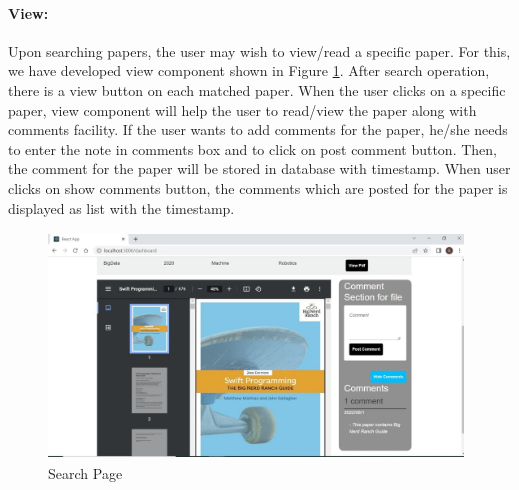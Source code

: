 \paragraph{\textbf{View:}} Upon searching papers, the user may wish to view/read a specific paper. For this, we have developed view component shown in Figure \ref{fig:view}. After search operation, there is a view button on each matched paper. When the user clicks on a specific paper, view component will help the user to read/view the paper along with comments facility. If the user wants to add comments for the paper, he/she needs to enter the note in comments box and to click on post comment button. Then, the comment for the paper will be stored in database with timestamp. When user clicks on show comments button, the comments which are posted for the paper is displayed as list with the timestamp.
\begin{figure}[h]
	\centering
	\includegraphics[width=11cm,height=6cm]{./images/view.png}
	\vspace{-0.5cm}
	\caption{Search Page}
	\label{fig:view}
\end{figure}





